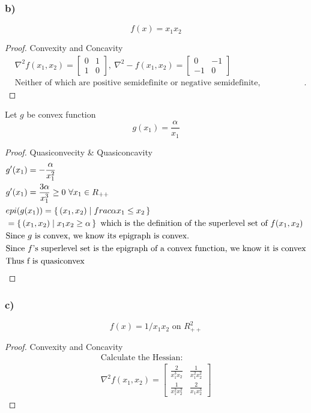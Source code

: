 \documentclass[12pt]{article}
\newenvironment{proposition}[2][Proposition]{\begin{trivlist}
\item[\hskip \labelsep {\bfseries #1}\hskip \labelsep {\bfseries #2.}]}{\end{trivlist}}
\begin{document}
\subsubsection*{b)}
$$f(x) = x_1x_2$$
\begin{proof}{Convexity and Concavity}
\begin{align*}
& \nabla^2f(x_1,x_2) = 
\begin{bmatrix}
0 & 1 \\
1 & 0
\end{bmatrix},\
\nabla^2-f(x_1,x_2) = 
\begin{bmatrix}
0 & -1 \\
-1 & 0
\end{bmatrix} \\
& \text{Neither of which are positive semidefinite or negative semidefinite, respectively, therefore not convex nor concave}.
\end{align*}
\end{proof}
\begin{proposition}{}
Let $g$ be convex function $$g(x_1) = \frac{\alpha}{x_1}$$
\end{proposition}
\begin{proof}{Quasiconvecity \& Quasiconcavity}
\begin{align*}
& g'(x_1) = -\frac{\alpha}{x_1^2}\\
& g'(x_1) = \frac{3\alpha}{x_1^3} \ge 0\ \forall x_1 \in R_{++}\\
& epi(g(x_1)) = \set{(x_1, x_2) | frac{\alpha}{x_1} \le x_2}\\
& = \set{(x_1, x_2) | x_1x_2 \ge \alpha} \text{ which is the definition of the superlevel set of $f(x_1,x_2)$} \\
& \text{Since $g$ is convex, we know its epigraph is convex.}\\
& \text{Since $f$'s superlevel set is the epigraph of a convex function, we know it is convex}\\
& \text{Thus f is quasiconvex}
\end{align*}
\end{proof}

\subsubsection*{c)}
$$f(x) = 1/x_1x_2 \text{ on } R^2_{++}$$
\begin{proof}{Convexity and Concavity}
\begin{align*}
& \text{Calculate the Hessian:}\\
& \nabla^2f(x_1,x_2) = 
\begin{bmatrix}
\frac{2}{x_1^3x_2} & \frac{1}{x_1^2x_2^2} \\
\frac{1}{x_1^2x_2^2} & \frac{2}{x_1x_2^3}
\end{bmatrix} 
& \text{}
\end{align*}
\end{proof}
\end{document}
